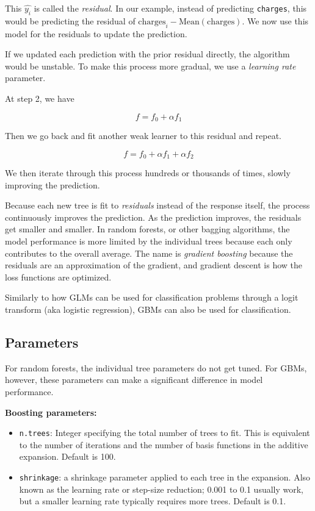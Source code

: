 \documentclass[openany]{book}
\begin{document}
This \(\hat{y_i}\) is called the \emph{residual}. In our example, instead of predicting \texttt{charges}, this would be predicting the residual of \(\text{charges}_i - \text{Mean}(\text{charges})\). We now use this model for the residuals to update the prediction.

If we updated each prediction with the prior residual directly, the algorithm would be unstable. To make this process more gradual, we use a \emph{learning rate} parameter.

At step 2, we have

\[f = f_0 + \alpha f_1\]

Then we go back and fit another weak learner to this residual and repeat.

\[f = f_0 + \alpha f_1 + \alpha f_2\]

We then iterate through this process hundreds or thousands of times, slowly improving the prediction.

Because each new tree is fit to \emph{residuals} instead of the response itself, the process continuously improves the prediction. As the prediction improves, the residuals get smaller and smaller. In random forests, or other bagging algorithms, the model performance is more limited by the individual trees because each only contributes to the overall average. The name is \emph{gradient boosting} because the residuals are an approximation of the gradient, and gradient descent is how the loss functions are optimized.

Similarly to how GLMs can be used for classification problems through a logit transform (aka logistic regression), GBMs can also be used for classification.

\hypertarget{parameters}{%
\subsection{Parameters}\label{parameters}}

For random forests, the individual tree parameters do not get tuned. For GBMs, however, these parameters can make a significant difference in model performance.

\textbf{Boosting parameters:}

\begin{itemize}
\item
  \texttt{n.trees}: Integer specifying the total number of trees to fit. This is equivalent to the number of iterations and the number of basis functions in the additive expansion. Default is 100.
\item
  \texttt{shrinkage}: a shrinkage parameter applied to each tree in the expansion. Also known as the learning rate or step-size reduction; 0.001 to 0.1 usually work, but a smaller learning rate typically requires more trees. Default is 0.1.
\end{itemize}
\end{document}
